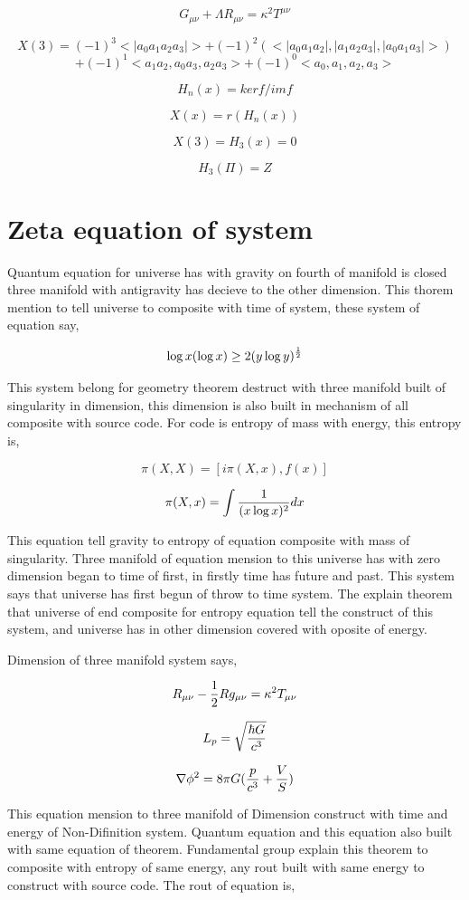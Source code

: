 \documentclass{jsarticle}
\begin{document}
$$ G_{\mu\nu} + \Lambda R_{\mu\nu} = \kappa^2 T^{\mu\nu} $$

$$ X(3) = (-1)^3 <|a_{0} a_{1} a_{2} a_{3}|> + (-1)^2 (<|a_{0}a_{1}a_{2}|, |a_{1}a_{2}a_{3}|, |a_{0}a_{1}a_{3}|>) $$
$$    + (-1)^1 <a_{1}a_{2}, a_{0}a_{3}, a_{2}a_{3}> + (-1)^0 <a_{0}, a_{1}, a_{2}, a_{3}> $$

    $$ H_{n} (x) = kerf/imf $$

    $$ X(x) = r(H_{n}(x)) $$

    $$ X(3) = H_{3}(x) = 0 $$

    $$ H_{3}(\Pi) = Z $$

\section{Zeta equation of system}

   Quantum equation for universe has with gravity on fourth of manifold is closed three manifold with antigravity
has decieve to the other dimension. This thorem mention to tell universe to composite with time of system,
these system of equation say, 

$$ \log x(\log x) \ge 2(y \log y)^{1 \over 2} $$

  This system belong for geometry theorem destruct with three manifold built of singularity in dimension,
this dimension is also built in mechanism of all composite with source code. For code is entropy of mass with
energy, this entropy is,

  $$ \pi (X, X) = [i \pi (X, x), f(x)] $$

  $$ \pi (X, x) = \int {1 \over (x \log x)^2}dx $$

  This equation tell gravity to entropy of equation composite with mass of singularity. Three manifold of equation
mension to this universe has with zero dimension began to time of first, in firstly time has future and past. This
system says that universe has first begun of throw to time system. The explain theorem that universe of end composite
for entropy equation tell the construct of this system, and universe has in other dimension covered with 
oposite of energy.

  Dimension of three manifold system says,

  $$  R_{\mu\nu} - {1 \over 2}Rg_{\mu\nu} = \kappa^2 T_{\mu\nu} $$

  $$ L_{p} = \sqrt{\hbar G \over c^3} $$

  $$ \nabla \phi^2 = 8 \pi G({p \over c^3} + {V \over S}) $$

  This equation mension to three manifold of Dimension construct with time and energy of Non-Difinition system. 
Quantum equation and this equation also built with same equation of theorem. Fundamental group explain this theorem
to composite with entropy of same energy, any rout built with same energy to construct with source code. 
The rout of equation is,
\end{document}
